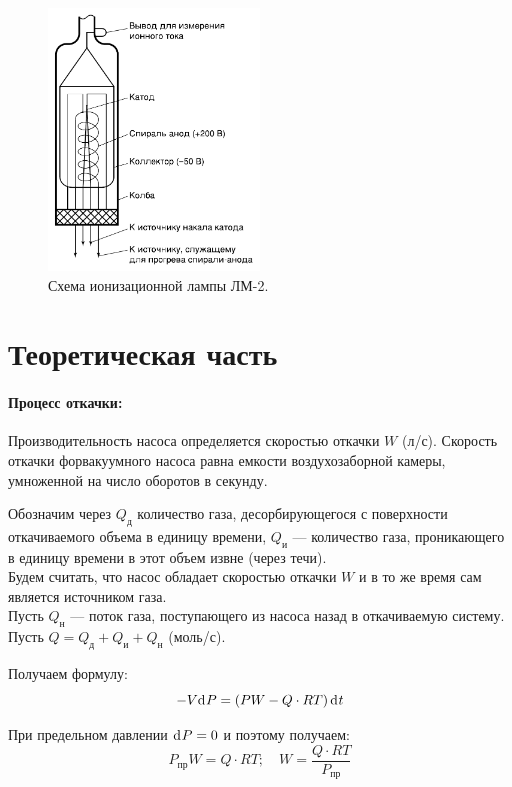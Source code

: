 \documentclass[a4paper,12pt]{article}
\begin{document}
\begin{figure}[H]
  \centering
  \includegraphics[width=0.5\textwidth]{6.png}
  \caption{Схема ионизационной лампы ЛМ-2.\label{fig:схема_ионизационной_лампы}}
\end{figure}

\section{Теоретическая часть}

\paragraph{Процесс откачки: }
Производительность насоса определяется скоростью откачки $W$ (л/с). Скорость откачки форвакуумного насоса равна емкости воздухозаборной камеры, умноженной на число оборотов в секунду.

Обозначим через $Q_\text{д}$ количество газа, десорбирующегося с поверхности откачиваемого объема в единицу времени,
$Q_\text{и}$ --- количество газа, проникающего в единицу времени в этот объем извне (через течи). \\
Будем считать, что насос обладает скоростью откачки $W$ и в то же время сам является источником газа. \\
Пусть $Q_\text{н}$ — поток газа, поступающего из насоса назад в откачиваемую систему. \\
Пусть $Q=Q_\text{д} + Q_\text{и} + Q_\text{н}$ (моль/с).

Получаем формулу:
\begin{equation}
  -V\d{P}=\left(P W - Q \cdot RT\right)\d{t}
\end{equation}

При предельном давлении $\d{P}=0$ и поэтому получаем:
\begin{equation}
  P_\text{пр} W = Q \cdot RT; \quad
  W = \frac{Q \cdot RT}{P_\text{пр}}
  \label{eq:2.2}
\end{equation}
\end{document}
